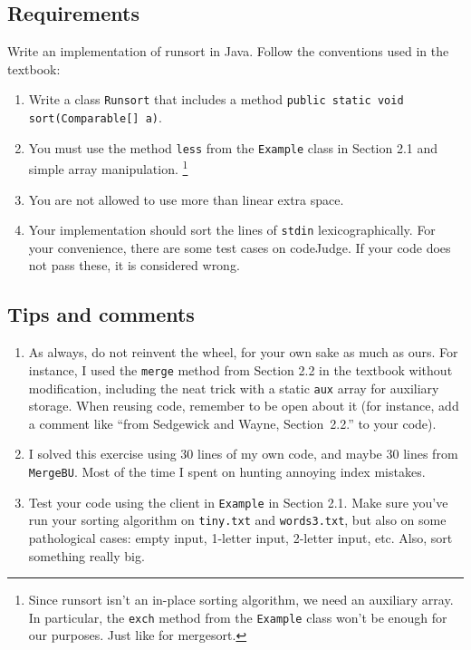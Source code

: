 \documentclass{tufte-handout}
\begin{document}
\subsection{Requirements}
Write an implementation of runsort in Java.
Follow the conventions used in the textbook:
\begin{enumerate}
\item Write a class \texttt{Runsort} that includes a method
\texttt{public static void sort(Comparable[] a)}.
\item You must use the method \texttt{less} from the \texttt{Example} class in Section 2.1 and  simple array manipulation.
\footnote{Since runsort isn't an in-place sorting algorithm, we  need an auxiliary array.
In particular, the \texttt{exch} method from the \texttt{Example} class won't be enough for our purposes.
Just like for mergesort.}
\item You are not allowed to use more than linear extra space.
\item Your implementation should sort the lines of \texttt{stdin} lexicographically. For your convenience, there are some test cases on codeJudge. If your code does not pass these, it is considered wrong.
\end{enumerate}

\subsection{Tips and comments}
\begin{enumerate}
\item As always, do not reinvent the wheel, for your own sake as much as ours.
For instance, I used the \texttt{merge} method from Section 2.2 in the textbook without modification, including the neat trick with a static \texttt{aux} array for auxiliary storage.
When reusing code, remember to be open about it (for instance, add a comment like ``from Sedgewick and Wayne, Section~2.2.'' to your code).
\item I solved this exercise using 30 lines of my own code, and maybe 30 lines from \texttt{MergeBU}.
Most of the time I spent on hunting annoying index mistakes.
\item Test your code using the client in \texttt{Example} in Section 2.1.
Make sure you've run your sorting algorithm on \texttt{tiny.txt} and \texttt{words3.txt}, but also on some pathological cases: empty input, 1-letter input, 2-letter input, etc.
Also, sort something really big.
\end{enumerate}
\end{document}
